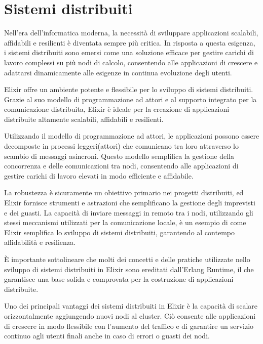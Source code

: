 \newpage

\section{Sistemi distribuiti}


Nell'era dell'informatica moderna, la necessità di
sviluppare applicazioni scalabili, affidabili e resilienti
è diventata sempre più critica.
In risposta a questa esigenza, i sistemi distribuiti sono
emersi come una soluzione efficace per gestire carichi
di lavoro complessi su più nodi di calcolo,
consentendo alle applicazioni di crescere e adattarsi
dinamicamente alle esigenze in continua evoluzione degli utenti.

Elixir offre un ambiente potente e flessibile
per lo sviluppo di sistemi distribuiti.
Grazie al suo modello di programmazione ad attori
e al supporto integrato per la comunicazione distribuita,
Elixir è ideale per la creazione di applicazioni distribuite
altamente scalabili, affidabili e resilienti.

Utilizzando il modello di programmazione ad attori,
le applicazioni possono essere decomposte in processi leggeri(attori)
che comunicano tra loro attraverso lo scambio di messaggi asincroni.
Questo modello semplifica la gestione della concorrenza
e delle comunicazioni tra nodi, consentendo alle applicazioni di
gestire carichi di lavoro elevati in modo efficiente e affidabile.

La robustezza è sicuramente un obiettivo primario nei progetti
distribuiti, ed Elixir fornisce strumenti e astrazioni che semplificano
la gestione degli imprevisti e dei guasti.
La capacità di inviare messaggi in remoto tra i nodi,
utilizzando gli stessi meccanismi utilizzati per la comunicazione
locale, è un esempio di come Elixir semplifica lo sviluppo di
sistemi distribuiti, garantendo al contempo affidabilità e resilienza.

È importante sottolineare che molti dei concetti e delle pratiche
utilizzate nello sviluppo di sistemi distribuiti in Elixir
sono ereditati dall'Erlang Runtime, il che garantisce una base
solida e comprovata per la costruzione di applicazioni distribuite.

Uno dei principali vantaggi dei sistemi distribuiti
in Elixir è la capacità di scalare orizzontalmente aggiungendo
nuovi nodi al cluster. 
Ciò consente alle applicazioni di crescere in modo flessibile
con l'aumento del traffico e di garantire un servizio continuo
agli utenti finali anche in caso di errori o guasti dei nodi.

